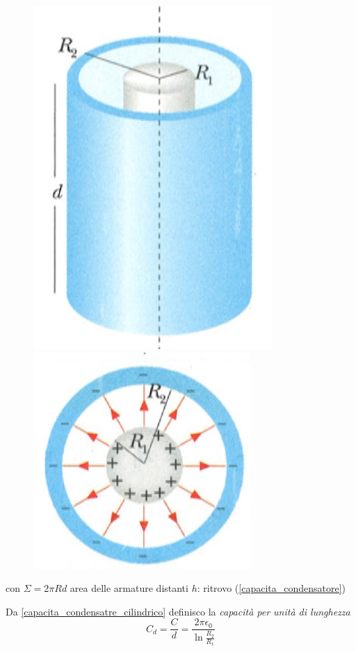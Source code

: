 \documentclass[class=book, crop=false, oneside, 12pt]{standalone}
\begin{document}
\begin{figure}[h]
    \includegraphics[scale=0.4]{condensatore_cilindrico.png}
    \includegraphics[scale=0.6]{condensatore_cilindrico_sezione.png}
    \centering
    \caption{}
\end{figure}

con \(\Sigma = 2 \pi R d\) area delle armature distanti \(h\): ritrovo (\ref{capacita_condensatore})

Da \ref{capacita_condensatre_cilindrico} definisco la \emph{capacità per unità di lunghezza}
\begin{equation}
    C_d = \frac{C}{d} = \frac{2 \pi \epsilon_0}{\ln \frac{R_2}{R_1}}
\end{equation}
\end{document}
